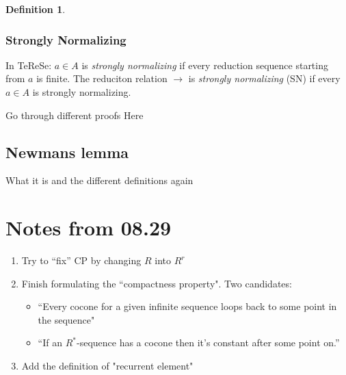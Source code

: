 \documentclass{scrartcl}
\newtheorem{dfn}[thm]{Definition}
\begin{document}
\begin{dfn}

\end{dfn}

\subsubsection{Strongly Normalizing}
\begin{center}
    In TeReSe: $a \in A$ is \textit{strongly normalizing} if every reduction sequence starting from $a$ is finite. The reduciton relation $\rightarrow$ is \textit{strongly normalizing} (SN) if every $a \in A$ is strongly normalizing.
\end{center}
Go through different proofs Here

\subsection{Newmans lemma}
What it is and the different definitions again

\subsection{}

\section{Notes from 08.29}

\begin{enumerate}
  \item Try to ``fix'' CP by changing $R$ into $R^r$
  \item Finish formulating the ``compactness property".  Two candidates:
  \begin{itemize}
    \item ``Every cocone for a given infinite sequence loops back to some point in the sequence"
    \item ``If an $R^*$-sequence has a cocone then it's constant after some point on.''
  \end{itemize}
  \item Add the definition of "recurrent element"
\end{enumerate}
\end{document}
